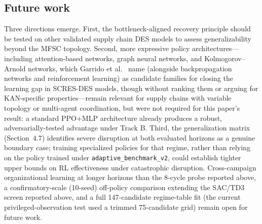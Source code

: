 \hypertarget{56-future-work}{%
\subsection{Future work}\label{56-future-work}}

Three directions emerge. First, the bottleneck-aligned recovery principle
should be tested on other validated supply chain DES models to assess
generalizability beyond the MFSC topology. Second, more expressive policy
architectures---including attention-based networks, graph neural networks,
and Kolmogorov--Arnold networks, which Garrido et
al.~\cite{garrido2024iccl} name (alongside backpropagation networks and
reinforcement learning) as candidate families for closing the
learning gap in SCRES-DES models, though without ranking them or
arguing for KAN-specific properties---remain relevant for supply chains with variable topology or
multi-agent coordination, but were not required for this paper's result: a
standard PPO+MLP architecture already produces a robust, adversarially-tested
advantage under Track B. Third, the generalization matrix (Section~4.7)
identifies severe disruption at both evaluated horizons as a genuine boundary case;
training specialized policies for that regime, rather than relying on the
policy trained under \texttt{adaptive\_benchmark\_v2}, could establish
tighter upper bounds on RL effectiveness under catastrophic disruption.
Cross-campaign organizational learning at longer horizons than the
8-cycle probe reported above, a confirmatory-scale (10-seed) off-policy
comparison extending the SAC/TD3 screen reported above, and a full
147-candidate regime-table fit (the current
privileged-observation test used a trimmed 75-candidate grid) remain open
for future work.

